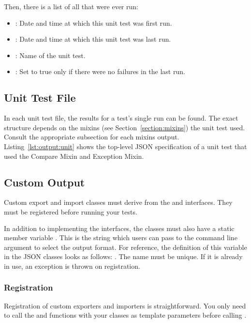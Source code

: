 Then, there is a list of all  that were ever run:

\begin{itemize}
\item {}: Date and time at which this unit test was first run.
\item {}: Date and time at which this unit test was last run.
\item {}: Name of the unit test.
\item {}: Set to true only if there were no failures in the last run.
\end{itemize}



\subsection{Unit Test File}
\label{section:output:unit}

In each unit test file, the results for a test's single run can be found. The exact structure depends on the mixins (see Section~\ref{section:mixins}) the unit test used. Consult the appropriate subsection for each mixins output. Listing~\ref{lst:output:unit} shows the top-level JSON specification of a unit test that used the Compare Mixin and Exception Mixin.



\subsection{Custom Output}
\label{section:output:custom}

Custom export and import classes must derive from the  and  interfaces. They must be registered before running your tests.

In addition to implementing the interfaces, the classes must also have a static member variable . This is the string which users can pass to the  command line argument to select the output format. For reference, the definition of this variable in the JSON classes looks as follows: . The name must be unique. If it is already in use, an exception is thrown on registration.

\subsubsection{Registration}
\label{section:output:custom:register}

Registration of custom exporters and importers is straightforward. You only need to call the  and  functions with your classes as template parameters before calling .

